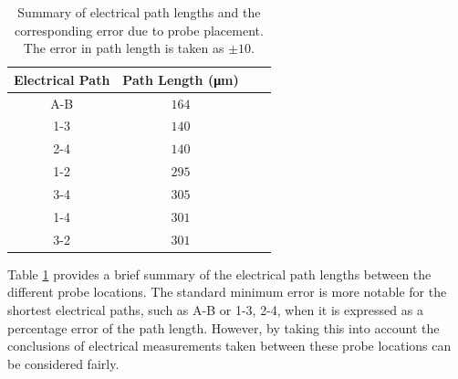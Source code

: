 \begin{refsection}
\begin{table}[ht]
\centering
\begin{tabular}{|c|c|c|c|}
\hline
Electrical Path & Path Length (\si{\micro\metre}) \\
\hline
A-B & $164$  \\
1-3 & $140$  \\
2-4 & $140$  \\
1-2 & $295$  \\
3-4 & $305$  \\
1-4 & $301$  \\
3-2 & $301$  \\
\hline
\end{tabular}
\caption{Summary of electrical path lengths and the corresponding error due to probe placement. The error in path length is taken as $\pm10$.}
\label{table:probe_placement_error}
\end{table}

Table \ref{table:probe_placement_error} provides a brief summary of the electrical path lengths between the different probe locations. The standard minimum error is more notable for the shortest electrical paths, such as A-B or 1-3, 2-4, when it is expressed as a percentage error of the path length. However, by taking this into account the conclusions of electrical measurements taken between these probe locations can be considered fairly.


\end{refsection}
